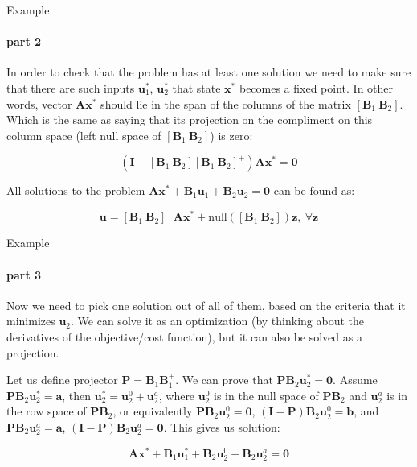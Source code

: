 \documentclass{beamer}
\begin{document}
\begin{frame}{Example}
\framesubtitle{part 2}
\begin{flushleft}

In order to check that the problem has at least one solution we need to make sure that there are such inputs $\mathbf{u}^*_1$, $\mathbf{u}^*_2$ that state $\mathbf{x}^*$ becomes a fixed point. In other words, vector $\mathbf{A}\mathbf{x}^*$ should lie in the span of the columns of the matrix $[\mathbf{B}_1 \ \mathbf{B}_2]$. Which is the same as saying that its projection on the compliment on this column space (left null space of $[\mathbf{B}_1 \ \mathbf{B}_2]$) is zero:

\begin{equation}
    (\mathbf{I} - [\mathbf{B}_1 \ \mathbf{B}_2] [\mathbf{B}_1 \ \mathbf{B}_2]^+) \mathbf{A}\mathbf{x}^* = \mathbf{0}
\end{equation}

All solutions to the problem $\mathbf{A} \mathbf{x}^* + \mathbf{B}_1 \mathbf{u}_1 + \mathbf{B}_2 \mathbf{u}_2 = \mathbf{0}$ can be found as:

\begin{equation}
    \mathbf{u} = [\mathbf{B}_1 \ \mathbf{B}_2]^+ \mathbf{A}\mathbf{x}^* + \text{null}([\mathbf{B}_1 \ \mathbf{B}_2])\mathbf{z}, \ \forall \mathbf{z}
\end{equation}

\end{flushleft}
\end{frame}



\begin{frame}{Example}
\framesubtitle{part 3}
\begin{flushleft}

Now we need to pick one solution out of all of them, based on the criteria that it minimizes $\mathbf{u}_2$. We can solve it as an optimization (by thinking about the derivatives of the objective/cost function), but it can also be solved as a projection.

\bigskip

Let us define projector $\mathbf{P} = \mathbf{B}_1 \mathbf{B}^+_1$. We can prove that $\mathbf{P} \mathbf{B}_2 \mathbf{u}^*_2 = \mathbf{0}$. Assume $\mathbf{P} \mathbf{B}_2 \mathbf{u}^*_2 = \mathbf{a}$, then $\mathbf{u}^*_2 =  \mathbf{u}^0_2 + \mathbf{u}^a_2$, where $\mathbf{u}^0_2$ is in the null space of $\mathbf{P} \mathbf{B}_2$ and $\mathbf{u}^a_2$ is in the row space of $\mathbf{P} \mathbf{B}_2$, or equivalently $\mathbf{P} \mathbf{B}_2 \mathbf{u}^0_2 = \mathbf{0}$, $(\mathbf{I} - \mathbf{P}) \mathbf{B}_2 \mathbf{u}^0_2 = \mathbf{b}$, and $\mathbf{P} \mathbf{B}_2 \mathbf{u}^a_2 = \mathbf{a}$, $(\mathbf{I} - \mathbf{P}) \mathbf{B}_2 \mathbf{u}^a_2 = \mathbf{0}$. This gives us solution:

\begin{equation}
    \mathbf{A} \mathbf{x}^* + \mathbf{B}_1 \mathbf{u}^*_1 + \mathbf{B}_2 \mathbf{u}^0_2 + \mathbf{B}_2 \mathbf{u}^a_2 = \mathbf{0}
\end{equation}

\end{flushleft}
\end{frame}
\end{document}
